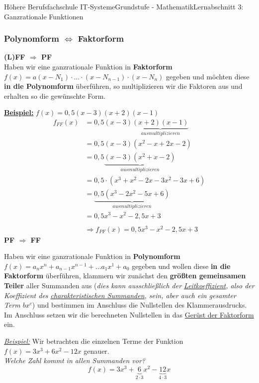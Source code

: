 \documentclass[11pt,twocolumn,oneside,openany,headings=optiontotoc,11pt,numbers=noenddot]{article}
\begin{document}
\begin{worksheet}{Höhere Berufsfachschule IT-Systeme}{Grundstufe - Mathematik}{Lernabschnitt 3: Ganzrationale Funktionen}
		\subsubsection*{Polynomform \(\Leftrightarrow\) Faktorform}
		\textbf{(L)FF \(\Rightarrow\) PF}\\
		Haben wir eine ganzrationale Funktion in \textbf{Faktorform} \(f(x) = a(x-N_1)\cdot\ldots\cdot(x-N_{n-1})\cdot(x-N_{n})\) gegeben und möchten diese \textbf{in die Polynomform} überführen, so multiplizieren wir die Faktoren aus und erhalten so die gewünschte Form.\\
		\par\noindent
		\underline{\textbf{Beispiel:}} \(f(x) = 0,5(x-3)(x+2)(x-1)\)
		\begin{align*}
			f_{FF}(x) & = 0,5(x-3)\underbrace{(x+2)(x-1)}_{ausmultiplizieren}\\
			& = 0,5(x-3)(x^2 - x +2x -2)\\
			& = 0,5\underbrace{(x-3)(x^2 + x -2)}_{ausmultiplizieren}\\
			& = 0,5\cdot(x^3 +x^2 -2x -3x^2 -3x +6)\\
			& = \underbrace{0,5(x^3 -2x^2 -5x +6)}_{ausmultiplizieren}\\
			& = 0,5x^3 - x^2 -2,5x +3\\
			\\
			& \Rightarrow f_{PF}(x) = 0,5x^3 -x^2 -2,5x + 3
		\end{align*}
		\textbf{PF \(\Rightarrow\) FF}\\
		\par\noindent
		Haben wir eine ganzrationale Funktion in \textbf{Polynomform} \(f(x) = a_nx^n + a_{n-1}x^{n-1} + \ldots a_1x^1 + a_0\) gegeben und wollen diese \textbf{in die Faktorform} überführen, klammern wir zunächst den \textbf{größten gemeinsamen Teiler} aller Summanden aus (\textit{dies kann ausschließlich der \underline{Leitkoeffizient}, also der Koeffizient des \underline{charakteristischen Summanden}, sein, aber auch ein gesamter Term \(bx^c\)}) und bestimmen im Anschluss die Nullstellen des Klammerausdrucks.\\
		Im Anschluss setzen wir die berechneten Nullstellen in das \underline{Gerüst der Faktorform} ein.\\
		\par\noindent
		\underline{\textit{Beispiel:}} Wir betrachten die einzelnen Terme der Funktion \(f(x) = 3x^3 + 6x^2 -12x\) genauer.\\
		\textit{Welche Zahl kommt in allen Summanden vor?}
		\[f(x) = 3x^3 + \underbrace{6}_{2\cdot{}3}x^2 - \underbrace{12}_{4\cdot{}3}x\]

\end{worksheet}
\end{document}
